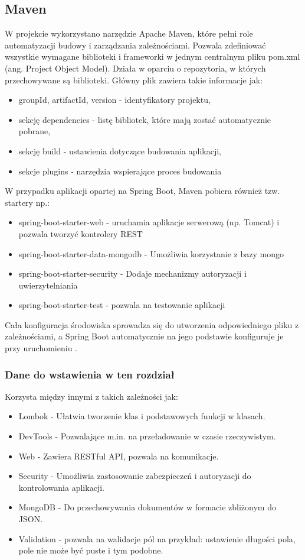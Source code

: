 \subsection*{Maven}
W projekcie wykorzystano narzędzie Apache Maven, które pełni role automatyzacji budowy i zarządzania zależnościami. Pozwala zdefiniować wszystkie wymagane biblioteki i frameworki w jednym centralnym pliku pom.xml (ang. Project Object Model). Działa w oparciu o repozytoria, w których przechowywane są biblioteki. Główny plik zawiera takie informacje jak:
\begin{itemize}
	\item groupId, artifactId, version - identyfikatory projektu,
	\item sekcję dependencies - listę bibliotek, które mają zostać automatycznie pobrane,
	\item sekcję build - ustawienia dotyczące budowania aplikacji,
	\item sekcje plugins - narzędzia wspierające proces budowania
\end{itemize}
W przypadku aplikacji opartej na Spring Boot, Maven pobiera również tzw. startery np.:
\begin{itemize}
	\item spring-boot-starter-web - uruchamia aplikacje serwerową (np. Tomcat) i pozwala tworzyć kontrolery REST
	\item spring-boot-starter-data-mongodb - Umożliwia korzystanie z bazy mongo
	\item spring-boot-starter-security - Dodaje mechanizmy autoryzacji i uwierzytelniania
	\item spring-boot-starter-test - pozwala na testowanie aplikacji
\end{itemize}
Cała konfiguracja środowiska sprowadza się do utworzenia odpowiedniego pliku z zależnościami, a Spring Boot automatycznie na jego podstawie konfiguruje je przy uruchomieniu \cite{MavenDocs}.
\subsubsection*{Dane do wstawienia w ten rozdział}
 Korzysta między innymi z takich zależności jak: 
\begin{itemize}
	\item Lombok - Ułatwia tworzenie klas i podstawowych funkcji w klasach.
	\item DevTools - Pozwalające m.in. na przeładowanie w czasie rzeczywistym.
	\item Web - Zawiera RESTful API, pozwala na komunikacje.
	\item Security - Umożliwia zastosowanie zabezpieczeń i autoryzacji do kontrolowania aplikacji.
	\item MongoDB - Do przechowywania dokumentów w formacie zbliżonym do JSON.
	\item Validation - pozwala na walidacje pól na przykład: ustawienie długości pola, pole nie może być puste i tym podobne.
\end{itemize}
